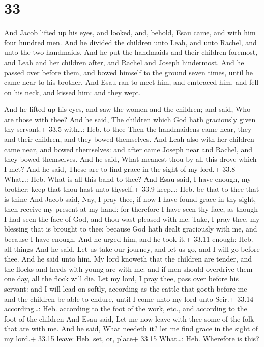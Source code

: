 \hypertarget{section-32}{%
\section{33}\label{section-32}}

 And Jacob lifted up his eyes, and looked, and, behold, Esau
came, and with him four hundred men. And he divided the children unto
Leah, and unto Rachel, and unto the two handmaids.  And he
put the handmaids and their children foremost, and Leah and her children
after, and Rachel and Joseph hindermost.  And he passed over
before them, and bowed himself to the ground seven times, until he came
near to his brother.  And Esau ran to meet him, and embraced
him, and fell on his neck, and kissed him: and they wept.

 And he lifted up his eyes, and saw the women and the
children; and said, Who are those with thee? And he said, The children
which God hath graciously given thy servant.+ 33.5 with\ldots: Heb. to
thee  Then the handmaidens came near, they and their
children, and they bowed themselves.  And Leah also with her
children came near, and bowed themselves: and after came Joseph near and
Rachel, and they bowed themselves.  And he said, What
meanest thou by all this drove which I met? And he said, These are to
find grace in the sight of my lord.+ 33.8 What\ldots: Heb. What is all
this band to thee?  And Esau said, I have enough, my
brother; keep that thou hast unto thyself.+ 33.9 keep\ldots: Heb. be
that to thee that is thine  And Jacob said, Nay, I pray
thee, if now I have found grace in thy sight, then receive my present at
my hand: for therefore I have seen thy face, as though I had seen the
face of God, and thou wast pleased with me.  Take, I pray
thee, my blessing that is brought to thee; because God hath dealt
graciously with me, and because I have enough. And he urged him, and he
took it.+ 33.11 enough: Heb. all things  And he said, Let
us take our journey, and let us go, and I will go before thee.
 And he said unto him, My lord knoweth that the children
are tender, and the flocks and herds with young are with me: and if men
should overdrive them one day, all the flock will die.  Let
my lord, I pray thee, pass over before his servant: and I will lead on
softly, according as the cattle that goeth before me and the children be
able to endure, until I come unto my lord unto Seir.+ 33.14
according\ldots: Heb. according to the foot of the work, etc., and
according to the foot of the children  And Esau said, Let
me now leave with thee some of the folk that are with me. And he said,
What needeth it? let me find grace in the sight of my lord.+ 33.15
leave: Heb. set, or, place+ 33.15 What\ldots: Heb. Wherefore is this?

